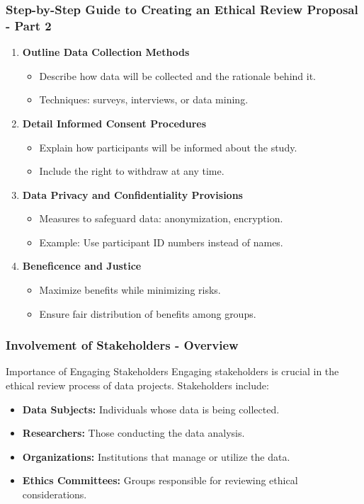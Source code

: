 \documentclass{beamer}
\begin{document}
\begin{frame}[fragile]
    \frametitle{Step-by-Step Guide to Creating an Ethical Review Proposal - Part 2}
    \begin{enumerate}[resume]
        \item \textbf{Outline Data Collection Methods}
        \begin{itemize}
            \item Describe how data will be collected and the rationale behind it.
            \item Techniques: surveys, interviews, or data mining.
        \end{itemize}
        
        \item \textbf{Detail Informed Consent Procedures}
        \begin{itemize}
            \item Explain how participants will be informed about the study.
            \item Include the right to withdraw at any time.
        \end{itemize}
        
        \item \textbf{Data Privacy and Confidentiality Provisions}
        \begin{itemize}
            \item Measures to safeguard data: anonymization, encryption.
            \item Example: Use participant ID numbers instead of names.
        \end{itemize}
        
        \item \textbf{Beneficence and Justice}
        \begin{itemize}
            \item Maximize benefits while minimizing risks.
            \item Ensure fair distribution of benefits among groups.
        \end{itemize}
    \end{enumerate}
\end{frame}

\begin{frame}[fragile]
    \frametitle{Involvement of Stakeholders - Overview}
    \begin{block}{Importance of Engaging Stakeholders}
        Engaging stakeholders is crucial in the ethical review process of data projects. Stakeholders include:
    \end{block}
    \begin{itemize}
        \item \textbf{Data Subjects:} Individuals whose data is being collected.
        \item \textbf{Researchers:} Those conducting the data analysis.
        \item \textbf{Organizations:} Institutions that manage or utilize the data.
        \item \textbf{Ethics Committees:} Groups responsible for reviewing ethical considerations.
    \end{itemize}
\end{frame}
\end{document}
